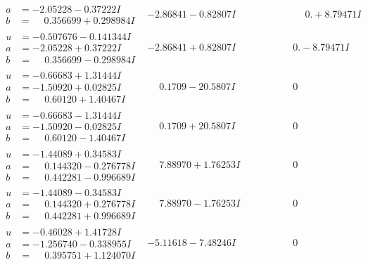 \documentclass[1p]{elsarticle_modified}
\theoremstyle{definition}
\begin{document}
$$\begin{array}{c|c|c}
\begin{aligned}
a &= -2.05228 - 0.37222 I \\
b &= \phantom{-}0.356699 + 0.298984 I\end{aligned}
 & -2.86841 - 0.82807 I & \phantom{-0.000000 -}0. + 8.79471 I \\ \hline\begin{aligned}
u &= -0.507676 - 0.141344 I \\
a &= -2.05228 + 0.37222 I \\
b &= \phantom{-}0.356699 - 0.298984 I\end{aligned}
 & -2.86841 + 0.82807 I & \phantom{-0.000000 } 0. - 8.79471 I \\ \hline\begin{aligned}
u &= -0.66683 + 1.31444 I \\
a &= -1.50920 + 0.02825 I \\
b &= \phantom{-}0.60120 + 1.40467 I\end{aligned}
 & \phantom{-}0.1709 - 20.5807 I & \phantom{-0.000000 } 0 \\ \hline\begin{aligned}
u &= -0.66683 - 1.31444 I \\
a &= -1.50920 - 0.02825 I \\
b &= \phantom{-}0.60120 - 1.40467 I\end{aligned}
 & \phantom{-}0.1709 + 20.5807 I & \phantom{-0.000000 } 0 \\ \hline\begin{aligned}
u &= -1.44089 + 0.34583 I \\
a &= \phantom{-}0.144320 - 0.276778 I \\
b &= \phantom{-}0.442281 - 0.996689 I\end{aligned}
 & \phantom{-}7.88970 + 1.76253 I & \phantom{-0.000000 } 0 \\ \hline\begin{aligned}
u &= -1.44089 - 0.34583 I \\
a &= \phantom{-}0.144320 + 0.276778 I \\
b &= \phantom{-}0.442281 + 0.996689 I\end{aligned}
 & \phantom{-}7.88970 - 1.76253 I & \phantom{-0.000000 } 0 \\ \hline\begin{aligned}
u &= -0.46028 + 1.41728 I \\
a &= -1.256740 - 0.338955 I \\
b &= \phantom{-}0.395751 + 1.124070 I\end{aligned}
 & -5.11618 - 7.48246 I & \phantom{-0.000000 } 0 \\ \hline\begin{aligned}

\end{aligned}
\end{array}$$
\end{document}
